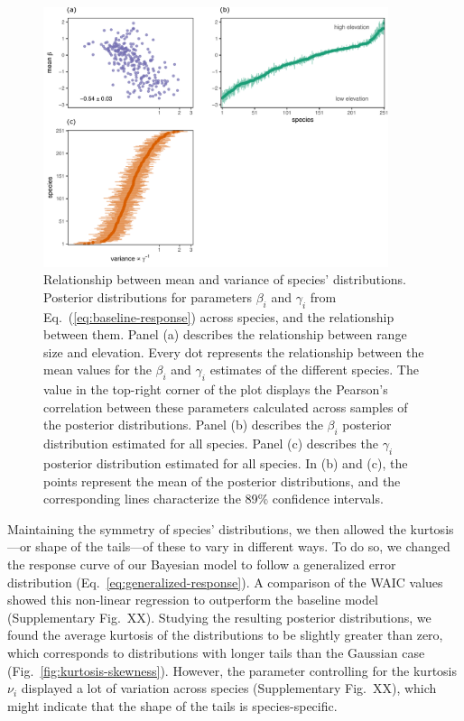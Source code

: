 \documentclass[11pt, a4paper]{article}
\begin{document}
\begin{figure}[h]
  \centering
    \includegraphics[width=0.9\textwidth]{figures/figure1-prime}
    	  \vspace{0.1cm}
	   \caption{Relationship between mean and variance of species' distributions. Posterior distributions for parameters $\beta_i$ and $\gamma_i$ from Eq.~(\ref{eq:baseline-response}) across species, and the relationship between them. Panel (a) describes the relationship between range size and elevation. Every dot represents the relationship between the mean values for the $\beta_i$ and $\gamma_i$ estimates of the different species. The value in the top-right corner of the plot displays the Pearson's correlation between these parameters calculated across samples of the posterior distributions. Panel (b) describes the $\beta_i$ posterior distribution estimated for all species. Panel (c) describes the $\gamma_i$ posterior distribution estimated for all species. In (b) and (c), the points represent the mean of the posterior distributions, and the corresponding lines characterize the 89\% confidence intervals.}
      \label{fig:correlation}
\end{figure}

Maintaining the symmetry of species' distributions, we then allowed the kurtosis---or shape of the tails---of these to vary in different ways. To do so, we changed the response curve of our Bayesian model to follow a generalized error distribution (Eq.~\ref{eq:generalized-response}). A comparison of the WAIC values showed this non-linear regression to outperform the baseline model (Supplementary Fig.~XX). Studying the resulting posterior distributions, we found the average kurtosis of the distributions to be slightly greater than zero, which corresponds to distributions with longer tails than the Gaussian case (Fig.~\ref{fig:kurtosis-skewness}). However, the parameter controlling for the kurtosis $\nu_i$ displayed a lot of variation across species (Supplementary Fig.~XX), which might indicate that the shape of the tails is species-specific. 
\end{document}
